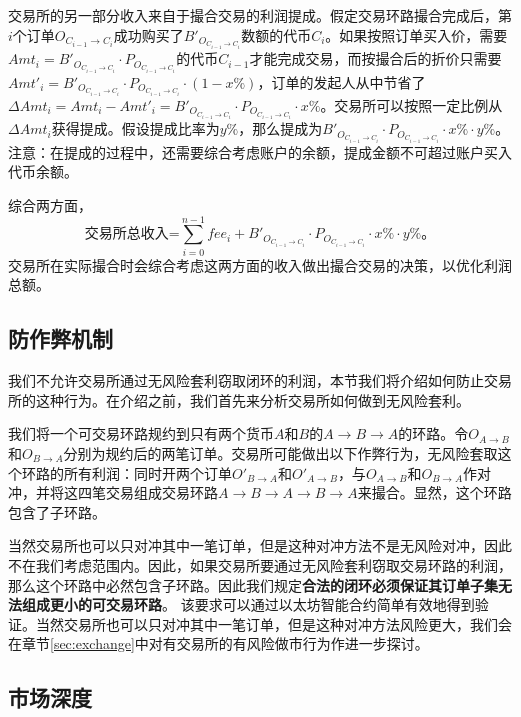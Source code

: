 \documentclass[UTF8,nofonts]{ctexart}
\begin{document}
交易所的另一部分收入来自于撮合交易的利润提成。假定交易环路撮合完成后，第$i$个订单$O_{C_{i-1}\rightarrow C_{i}}$成功购买了$B'_{O_{C_{i-1}\rightarrow C_{i}}}$数额的代币$C_{i}$。如果按照订单买入价，需要$Amt_{i}=B'_{O_{C_{i-1}\rightarrow C_{i}}}\cdot P_{O_{C_{i-1}\rightarrow C_{i}}}$的代币$C_{i-1}$才能完成交易，而按撮合后的折价只需要$Amt'_{i}=B'_{O_{C_{i-1}\rightarrow C_{i}}}\cdot P_{O_{C_{i-1}\rightarrow C_{i}}} \cdot (1-x\%)$，订单的发起人从中节省了$\Delta Amt_{i}=Amt_{i}-Amt'_{i}=B'_{O_{C_{i-1}\rightarrow C_{i}}}\cdot P_{O_{C_{i-1}\rightarrow C_{i}}} \cdot x\%$。交易所可以按照一定比例从$\Delta Amt_{i}$获得提成。假设提成比率为$y\%$，那么提成为$B'_{O_{C_{i-1}\rightarrow C_{i}}}\cdot P_{O_{C_{i-1}\rightarrow C_{i}}} \cdot x\% \cdot y\%$。注意：在提成的过程中，还需要综合考虑账户的余额，提成金额不可超过账户买入代币余额。

综合两方面，
$$
\text{交易所总收入=}\sum^{n-1}_{i=0}fee_{i} + B'_{O_{C_{i-1}\rightarrow C_{i}}}\cdot P_{O_{C_{i-1}\rightarrow C_{i}}} \cdot x\% \cdot y\%\text{。}
$$
交易所在实际撮合时会综合考虑这两方面的收入做出撮合交易的决策，以优化利润总额。

\subsection{防作弊机制}
我们不允许交易所通过无风险套利窃取闭环的利润，本节我们将介绍如何防止交易所的这种行为。在介绍之前，我们首先来分析交易所如何做到无风险套利。

我们将一个可交易环路规约到只有两个货币$A$和$B$的$A\rightarrow B\rightarrow A$的环路。令$O_{A\rightarrow B}$和$O_{B\rightarrow A}$分别为规约后的两笔订单。交易所可能做出以下作弊行为，无风险套取这个环路的所有利润：同时开两个订单$O'_{ B\rightarrow A}$和$O'_{ A\rightarrow B}$，与$O_{A\rightarrow B}$和$O_{B\rightarrow A}$作对冲，并将这四笔交易组成交易环路$A\rightarrow B\rightarrow A\rightarrow B\rightarrow A$来撮合。显然，这个环路包含了子环路。

当然交易所也可以只对冲其中一笔订单，但是这种对冲方法不是无风险对冲，因此不在我们考虑范围内。因此，如果交易所要通过无风险套利窃取交易环路的利润，那么这个环路中必然包含子环路。因此我们规定{\bfseries 合法的闭环必须保证其订单子集无法组成更小的可交易环路}。
该要求可以通过以太坊智能合约简单有效地得到验证。当然交易所也可以只对冲其中一笔订单，但是这种对冲方法风险更大，我们会在章节\ref{sec:exchange}中对有交易所的有风险做市行为作进一步探讨。

\subsection{市场深度\label{sec:marketdepth}}
\end{document}
